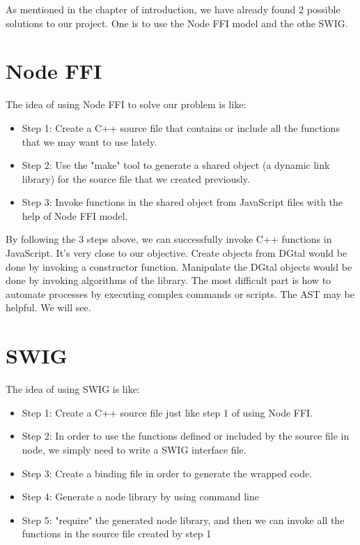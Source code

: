 \label{chap:Proposals}

As mentioned in the chapter of introduction, we have already found 2 possible solutions to our project. One is to use the Node FFI model and the othe SWIG.

\section{Node FFI}

The idea of using Node FFI to solve our problem is like:
\begin{itemize}
   \item Step 1: Create a C++ source file that contains or include all the functions that we may want to use lately.
   \item Step 2: Use the "make" tool to generate a shared object (a dynamic link library) for the source file that we created previously.
   \item Step 3: Invoke functions in the shared object from JavaScript files with the help of Node FFI model. \newline
\end{itemize}

By following the 3 steps above, we can successfully invoke C++ functions in JavaScript. It's very close to our objective. Create objects from DGtal would be done by invoking a constructor function. Manipulate the DGtal objects would be done by invoking algorithms of the library. The most difficult part is how to automate processes by executing complex commands or scripts. The AST may be helpful. We will see.


\section{SWIG}
The idea of using SWIG is like:
    \begin{itemize}
       \item Step 1: Create a C++ source file just like step 1 of using Node FFI.
       \item Step 2: In order to use the functions defined or included by the source file in node, we simply need to write a SWIG interface file.
       \item Step 3: Create a binding file in order to generate the wrapped code.
       \item Step 4: Generate a node library by using command line
       \item Step 5: "require" the generated node library, and then we can invoke all the functions in the source file created by step 1 \newline
    \end{itemize}
    
